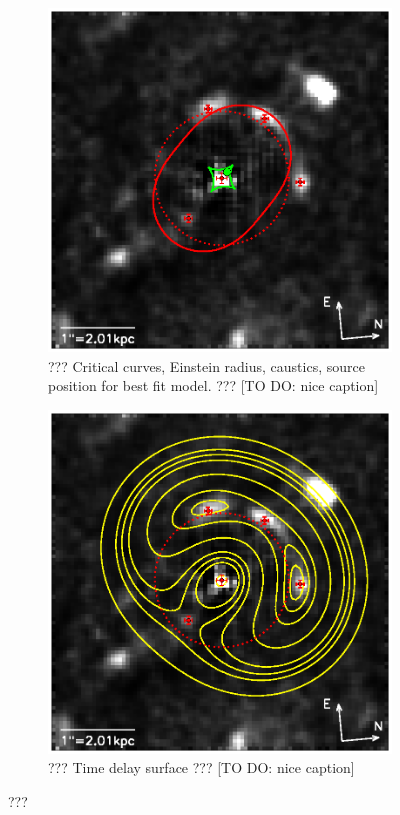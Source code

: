 \begin{figure}
\centering
\begin{subfigure}{.5\textwidth}
  \centering
  \includegraphics[width=.9\linewidth]{fig/lens_einstein.ps}
  \caption{??? Critical curves, Einstein radius, caustics, source position for best fit model. ??? [TO DO: nice caption]}
  \label{fig:lensbestfiteinsteincurves}
\end{subfigure}%
\begin{subfigure}{.5\textwidth}
  \centering
  \includegraphics[width=.9\linewidth]{fig/lens_timedelay.ps}
  \caption{??? Time delay surface ??? [TO DO: nice caption]}
  \label{fig:lensbestfittimedelay}
\end{subfigure}
\caption{???}
\label{fig:???}
\end{figure}

